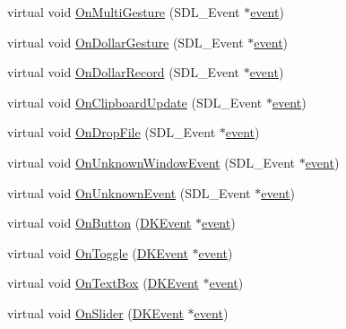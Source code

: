 \begin{DoxyCompactItemize}
\item 
virtual void \hyperlink{class_d_k_event_a131d24fd0044beba70cc4592a9fb8e4b}{On\-Multi\-Gesture} (S\-D\-L\-\_\-\-Event $\ast$\hyperlink{class_d_k_event_a3deebb932ed734363c4ece87971bc45f}{event})
\item 
virtual void \hyperlink{class_d_k_event_a53ac21f4bea00f0525fc398b3720140f}{On\-Dollar\-Gesture} (S\-D\-L\-\_\-\-Event $\ast$\hyperlink{class_d_k_event_a3deebb932ed734363c4ece87971bc45f}{event})
\item 
virtual void \hyperlink{class_d_k_event_a3f2be9cd710fd4e4802c516c53eae4bb}{On\-Dollar\-Record} (S\-D\-L\-\_\-\-Event $\ast$\hyperlink{class_d_k_event_a3deebb932ed734363c4ece87971bc45f}{event})
\item 
virtual void \hyperlink{class_d_k_event_ac2a9638d8bef480b8c90a1b1ef4ef17a}{On\-Clipboard\-Update} (S\-D\-L\-\_\-\-Event $\ast$\hyperlink{class_d_k_event_a3deebb932ed734363c4ece87971bc45f}{event})
\item 
virtual void \hyperlink{class_d_k_event_ab65929f7f186d0414a2e2c072ba6fb6f}{On\-Drop\-File} (S\-D\-L\-\_\-\-Event $\ast$\hyperlink{class_d_k_event_a3deebb932ed734363c4ece87971bc45f}{event})
\item 
virtual void \hyperlink{class_d_k_event_a47b63cc8eff9036fd74840e717884d79}{On\-Unknown\-Window\-Event} (S\-D\-L\-\_\-\-Event $\ast$\hyperlink{class_d_k_event_a3deebb932ed734363c4ece87971bc45f}{event})
\item 
virtual void \hyperlink{class_d_k_event_a5860516158278703c090b4b3a5857159}{On\-Unknown\-Event} (S\-D\-L\-\_\-\-Event $\ast$\hyperlink{class_d_k_event_a3deebb932ed734363c4ece87971bc45f}{event})
\item 
virtual void \hyperlink{class_d_k_event_a0742f1b6f3bf9b39c00b59b8c0a2af7c}{On\-Button} (\hyperlink{class_d_k_event}{D\-K\-Event} $\ast$\hyperlink{class_d_k_event_a3deebb932ed734363c4ece87971bc45f}{event})
\item 
virtual void \hyperlink{class_d_k_event_a789788e1b6427ad5b38708cba3a30cc5}{On\-Toggle} (\hyperlink{class_d_k_event}{D\-K\-Event} $\ast$\hyperlink{class_d_k_event_a3deebb932ed734363c4ece87971bc45f}{event})
\item 
virtual void \hyperlink{class_d_k_event_ab46440dc591d0d67f7b76a271f936295}{On\-Text\-Box} (\hyperlink{class_d_k_event}{D\-K\-Event} $\ast$\hyperlink{class_d_k_event_a3deebb932ed734363c4ece87971bc45f}{event})
\item 
virtual void \hyperlink{class_d_k_event_ae3a0982f82953b0d4de763a01a06437d}{On\-Slider} (\hyperlink{class_d_k_event}{D\-K\-Event} $\ast$\hyperlink{class_d_k_event_a3deebb932ed734363c4ece87971bc45f}{event})

\end{DoxyCompactItemize}

